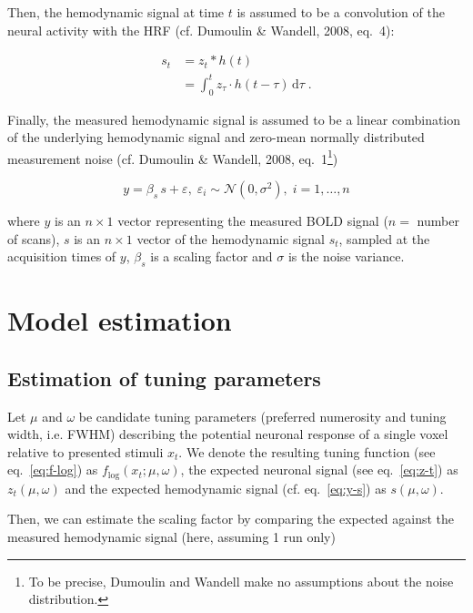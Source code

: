 \documentclass[a4paper,12pt]{article}
\begin{document}
Then, the hemodynamic signal at time $t$ is assumed to be a convolution of the neural activity with the HRF (cf. Dumoulin \& Wandell, 2008, eq.~4):

\vspace{-0.5em}
\begin{equation} \label{eq:s-t}
\begin{split}
s_t &= z_t \ast h(t) \\
&= \int_{0}^{t} z_\tau \cdot h(t-\tau) \, \mathrm{d}\tau \; .
\end{split}
\end{equation}

Finally, the measured hemodynamic signal is assumed to be a linear combination of the underlying hemodynamic signal and zero-mean normally distributed measurement noise (cf. Dumoulin \& Wandell, 2008, eq.~1\footnote{To be precise, Dumoulin and Wandell make no assumptions about the noise distribution.})

\begin{equation} \label{eq:y-s}
y = \beta_s \, s + \varepsilon, \; \varepsilon_i \sim \mathcal{N}(0, \sigma^2), \; i = 1,\ldots,n
\end{equation}

where $y$ is an $n \times 1$ vector representing the measured BOLD signal ($n =$ number of scans), $s$ is an $n \times 1$ vector of the hemodynamic signal $s_t$, sampled at the acquisition times of $y$, $\beta_s$ is a scaling factor and $\sigma$ is the noise variance.


\pagebreak
\section{Model estimation} \label{sec:Est}

\subsection{Estimation of tuning parameters}

Let $\mu$ and $\omega$ be candidate tuning parameters (preferred numerosity and tuning width, i.e. FWHM) describing the potential neuronal response of a single voxel relative to presented stimuli $x_t$. We denote the resulting tuning function (see eq.~\ref{eq:f-log}) as $f_\mathrm{log}(x_t; \mu, \omega)$, the expected neuronal signal (see eq.~\ref{eq:z-t}) as $z_t(\mu,\omega)$ and the expected hemodynamic signal (cf. eq.~\ref{eq:y-s}) as $s(\mu,\omega)$.

Then, we can estimate the scaling factor by comparing the expected against the measured hemodynamic signal (here, assuming 1 run only)
\end{document}
